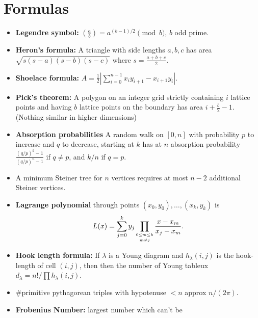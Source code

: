\documentclass[9pt,a4paper,landscape,oneside]{amsart}
\newenvironment{myitemize}
{\begin{itemize}[leftmargin=.3cm]
	\setlength{\itemsep}{0pt}
	\setlength{\parskip}{0pt}
	\setlength{\parsep}{0pt}     }
{ \end{itemize}                  }
\begin{document}
\begin{multicols*}{3}
\begin{myitemize}
\end{myitemize}

\section{Formulas}


\begin{myitemize}
	\item \textbf{Legendre symbol:} $\left(\frac{a}{b}\right) = a^{(b-1)/2} \pmod{b}$, $b$ odd prime.
	\item \textbf{Heron's formula:} A triangle with side lengths
		$a,b,c$ has area $\sqrt{s(s-a)(s-b)(s-c)}$ where $s =
		\frac{a+b+c}{2}$.
	\item \textbf{Shoelace formula:} $A = \frac12 |\sum_{i=0}^{n-1} x_iy_{i+1} - x_{i+1}y_i|$.
	\item \textbf{Pick's theorem:} A polygon on an integer grid
		strictly containing $i$ lattice points and having $b$ lattice
		points on the boundary has area $i + \frac{b}{2} - 1$. (Nothing
		similar in higher dimensions)
	\item \textbf{Absorption probabilities} A random walk on $[0,n]$ with probability $p$ to increase and $q$ to decrease, starting at $k$ has at $n$ absorption probability $\frac{(q/p)^k-1}{(q/p)^n-1}$ if $q \not= p$, and $k/n$ if $q = p$.
	\item A minimum Steiner tree for $n$ vertices requires at most $n-2$ additional Steiner vertices.
	\item \textbf{Lagrange polynomial} through points $(x_0,y_0),\ldots,(x_k,y_k)$ is
	\[
		L(x) = \sum_{j=0}^k y_j \prod_{\shortstack{$\scriptscriptstyle 0\leq m \leq k$ \\ $\scriptscriptstyle m\neq j$}} \frac{x-x_m}{x_j - x_m}.
	\]
	\item \textbf{Hook length formula:} If $\lambda$ is a Young diagram and $h_{\lambda}(i,j)$ is the hook-length of cell $(i,j)$, then then the number of Young tableux $d_{\lambda} = n!/\prod h_{\lambda}(i,j)$.
	\item \#primitive pythagorean triples with hypotenuse $<n$ approx $n/(2\pi)$.
	\item \textbf{Frobenius Number:} largest number which can't be

\end{myitemize}
\end{multicols*}
\end{document}
